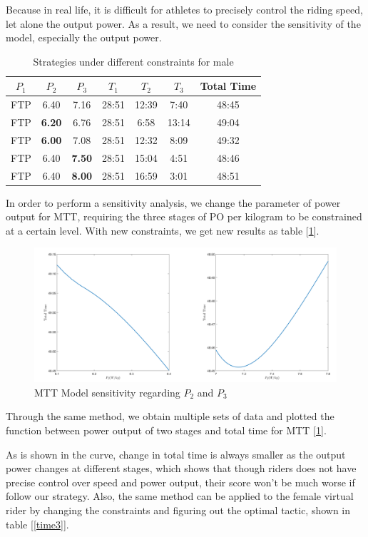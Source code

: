 
Because in real life, it is difficult for athletes to precisely control the riding speed, let alone the output power. As a result, we need to consider the sensitivity of the model, especially the output power.
\begin{table}[h]
	\setlength\tabcolsep{13pt}%
	\setlength{\belowcaptionskip}{0.2cm}
	\centering
	\caption{Strategies under different constraints for male}
	\begin{tabular}{ccc|cccc}
		\toprule[2pt]
		$P_1$    & $P_2$    & $P_3$    & $T_1$    & $T_2$    & $T_3$    & Total Time \\
		\midrule
		FTP   & 6.40  & 7.16  & 28:51 & 12:39 & 7:40  & 48:45 \\
		FTP   & \textbf{6.20 } & 6.76  & 28:51 & 6:58  & 13:14 & 49:04 \\
		FTP   & \textbf{6.00 } & 7.08  & 28:51 & 12:32 & 8:09  & 49:32 \\
		FTP   & 6.40  & \textbf{7.50 } & 28:51 & 15:04 & 4:51  & 48:46 \\
		FTP   & 6.40  & \textbf{8.00 } & 28:51 & 16:59 & 3:01  & 48:51 \\
		\bottomrule[2pt]
	\end{tabular}%
	\label{div}%
\end{table}%
\par In order to perform a sensitivity analysis, we change the parameter of power output for MTT, requiring the three stages of PO per kilogram to be constrained at a certain level. With new constraints, we get new results as table [\ref{div}].
\begin{figure}[h]
	\centering
	\includegraphics[width=0.7\linewidth]{image/p1}
	\caption{MTT Model sensitivity regarding $P_2$ and $P_3$}
	\label{P1}
\end{figure}
\par Through the same method, we obtain multiple sets of data and plotted the function between power output of two stages and total time for MTT [\ref{P1}]. 
\par As is shown in the curve, change in total time is always smaller as the output power changes at different stages, which shows that though riders does not have precise control over speed and power output, their score won't be much worse if follow our strategy. Also, the same method can be applied to the female virtual rider by changing the constraints and figuring out the optimal tactic, shown in table [\ref{time3}].
